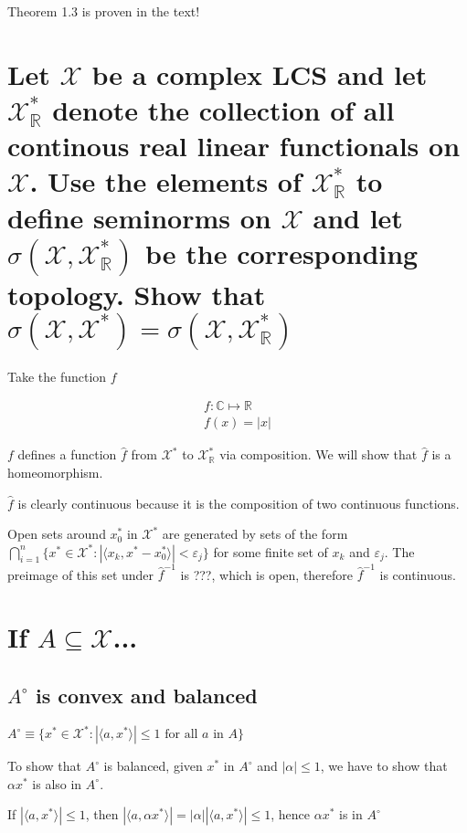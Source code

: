 \documentclass{article}
\begin{document}
Theorem 1.3 is proven in the text!

\section{Let $\mathscr{X}$ be a complex LCS and let $\mathscr{X}^*_{\mathbb{R}}$ denote the collection of all continous real linear functionals on $\mathscr{X}$. Use the elements of $\mathscr{X}^*_{\mathbb{R}}$  to define seminorms on $\mathscr{X}$ and let $\sigma(\mathscr{X}, \mathscr{X}^*_{\mathbb{R}})$ be the corresponding topology. Show that $\sigma(\mathscr{X}, \mathscr{X}^*) = \sigma(\mathscr{X}, \mathscr{X}^*_{\mathbb{R}})$}

Take the function $f$

\begin{align*}
f: \mathbb{C} \mapsto \mathbb{R} \\
f(x) = |x|
\end{align*}

$f$ defines a function $\hat{f}$ from $\mathscr{X}^*$ to $\mathscr{X}^*_{\mathbb{R}}$ via composition. We will show that $\hat{f}$ is a homeomorphism.

$\hat{f}$ is clearly continuous because it is the composition of two continuous functions.

Open sets around $x^*_0$ in $\mathscr{X}^*$ are generated by sets of the form $\bigcap^n_{i=1}\{x^*\in \mathscr{X}^* : |\langle x_k, x^* - x^*_0 \rangle| < \varepsilon_j\}$ for some finite set of $x_k$ and $\varepsilon_j$. The preimage of this set under $\hat{f}^{-1}$ is ???, which is open, therefore $\hat{f}^{-1}$ is continuous.

\section{If $A \subseteq  \mathscr{X}$...}

\subsection{$A^{\circ}$ is convex and balanced}

$A^{\circ} \equiv \{x^*\in \mathscr{X}^*: | \langle a, x^*\rangle | \le 1 \text{ for all } a \text{ in } A\}$

To show that $A^{\circ}$ is balanced, given $x^*$ in $A^{\circ}$ and $|\alpha| \le 1$, we have to show that $\alpha x^*$ is also in $A^{\circ}$.

If $|\langle a, x^*\rangle | \le 1$, then $|\langle a, \alpha x^*\rangle | = |\alpha |  | \langle a, x^* \rangle | \le 1$, hence $\alpha x^*$ is in $A^{\circ}$
\end{document}
